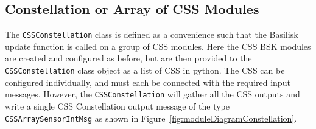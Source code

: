 \subsection{Constellation or Array of CSS Modules}
The {\tt CSSConstellation} class is defined as a convenience such that the Basilisk update function is called on a group of CSS modules.  Here the CSS BSK modules are created and configured as before, but are then provided to the {\tt CSSConstellation} class object as a list of CSS in python.  The CSS can be configured individually, and must each be connected with the required input messages.  However, the {\tt CSSConstellation} will gather all the CSS outputs and write a single CSS Constellation output message of the type {\tt CSSArraySensorIntMsg} as shown in Figure~\ref{fig:moduleDiagramConstellation}.  



